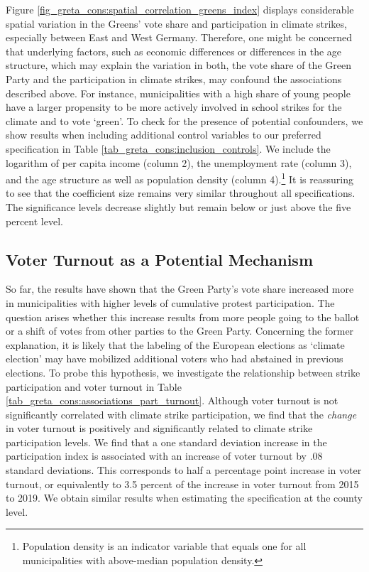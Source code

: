 Figure \ref{fig_greta_cons:spatial_correlation_greens_index} displays considerable spatial variation in the Greens' vote share and participation in climate strikes, especially between East and West Germany. Therefore, one might be concerned that underlying factors, such as economic differences or differences in the age structure, which may explain the variation in both, the vote share of the Green Party and the participation in climate strikes, may confound the associations described above. For instance, municipalities with a high share of young people have a larger propensity to be more actively involved in school strikes for the climate and to vote `green'. To check for the presence of potential confounders, we show results when including additional control variables to our preferred specification in Table \ref{tab_greta_cons:inclusion_controls}. We include the logarithm of per capita income (column 2), the unemployment rate (column 3), and the age structure as well as population density (column 4).\footnote{Population density is an indicator variable that equals one for all municipalities with above-median population density.} It is reassuring to see that the coefficient size remains very similar throughout all specifications. The significance levels decrease slightly but remain below or just above the five percent level. 




\subsection{Voter Turnout as a Potential Mechanism}



So far, the results have shown that the Green Party's vote share increased more in municipalities with higher levels of cumulative protest participation. The question arises whether this increase results from more people going to the ballot or a shift of votes from other parties to the Green Party. Concerning the former explanation, it is likely that the labeling of the European elections as `climate election' may have mobilized additional voters who had abstained in previous elections. To probe this hypothesis, we investigate the relationship between strike participation and voter turnout in Table \ref{tab_greta_cons:associations_part_turnout}. Although voter turnout is not significantly correlated with climate strike participation, we find that the \emph{change} in voter turnout is positively and significantly related to climate strike participation levels. We find that a one standard deviation increase in the participation index is associated with an increase of voter turnout by .08 standard deviations. This corresponds to half a percentage point increase in voter turnout, or equivalently to 3.5 percent of the increase in voter turnout from 2015 to 2019. We obtain similar results when estimating the specification at the county level.


